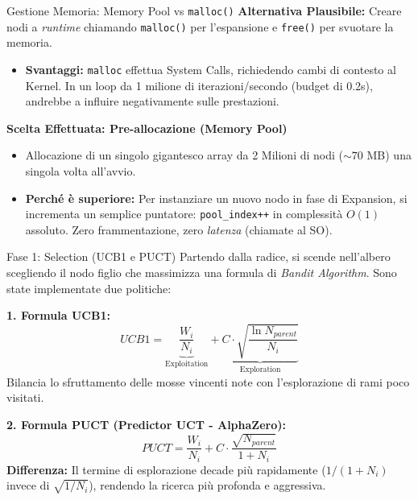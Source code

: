 \documentclass[10pt]{beamer}
\begin{document}
\begin{frame}{Gestione Memoria: Memory Pool vs \texttt{malloc()}}
    \textbf{Alternativa Plausibile:} Creare nodi a \textit{runtime} chiamando \texttt{malloc()} per l'espansione e \texttt{free()} per svuotare la memoria.
    \begin{itemize}
        \item \textbf{Svantaggi:} \texttt{malloc} effettua System Calls, richiedendo cambi di contesto al Kernel. In un loop da 1 milione di iterazioni/secondo (budget di 0.2s), andrebbe a influire negativamente sulle prestazioni.
    \end{itemize}
    
    \vspace{0.2cm}
    \textbf{Scelta Effettuata: Pre-allocazione (Memory Pool)}
    \begin{itemize}
        \item Allocazione di un singolo gigantesco array da 2 Milioni di nodi ($\sim 70$ MB) una singola volta all'avvio.
        \item \textbf{Perché è superiore:} Per instanziare un nuovo nodo in fase di Expansion, si incrementa un semplice puntatore: \texttt{pool\_index++} in complessità $O(1)$ assoluto. Zero frammentazione, zero \textit{latenza} (chiamate al SO).
    \end{itemize}
\end{frame}

\begin{frame}{Fase 1: Selection (UCB1 e PUCT)}
    Partendo dalla radice, si scende nell'albero scegliendo il nodo figlio che massimizza una formula di \textit{Bandit Algorithm}. Sono state implementate due politiche:
    
    \vspace{0.2cm}
    \textbf{1. Formula UCB1:}
    $$UCB1 = \underbrace{\frac{W_i}{N_i}}_{\text{Exploitation}} + \underbrace{C \cdot \sqrt{\frac{\ln N_{parent}}{N_i}}}_{\text{Exploration}}$$
    Bilancia lo sfruttamento delle mosse vincenti note con l'esplorazione di rami poco visitati.
    
    \vspace{0.2cm}
    \textbf{2. Formula PUCT (Predictor UCT - AlphaZero):}
    $$PUCT = \frac{W_i}{N_i} + C \cdot \frac{\sqrt{N_{parent}}}{1 + N_i}$$
    \textbf{Differenza:} Il termine di esplorazione decade più rapidamente ($1/(1+N_i)$ invece di $\sqrt{1/N_i}$), rendendo la ricerca più profonda e aggressiva.
\end{frame}
\end{document}
